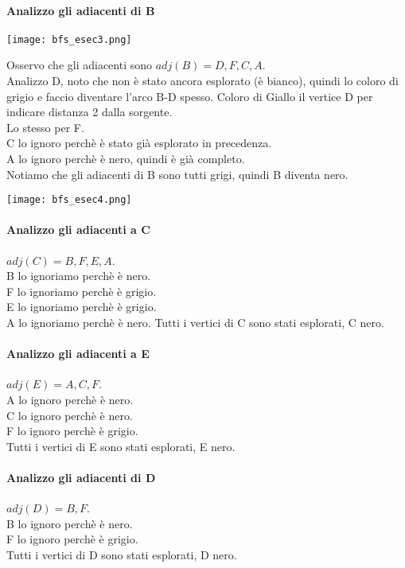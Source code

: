 \paragraph*{Analizzo gli adiacenti di B}
\begin{center}
    \texttt{[image: bfs\_esec3.png]}
\end{center}
Osservo che gli adiacenti sono \ra $adj(B) = D,F,C,A$.\\
Analizzo D, noto che non è stato ancora esplorato (è bianco), quindi lo coloro di grigio e
faccio diventare l'arco B-D spesso. Coloro di Giallo il vertice D per indicare distanza 2 dalla
sorgente.\\
Lo stesso per F.\\
C lo ignoro perchè è stato già esplorato in precedenza.\\
A lo ignoro perchè è nero, quindi è già completo.\\
Notiamo che gli adiacenti di B sono tutti grigi, quindi B diventa nero.
\begin{center}
    \texttt{[image: bfs\_esec4.png]}
\end{center}
\paragraph*{Analizzo gli adiacenti a C} \ra $adj(C) = B,F,E,A$.\\
B lo ignoriamo perchè è nero.\\
F lo ignoriamo perchè è grigio.\\
E lo ignoriamo perchè è grigio.\\
A lo ignoriamo perchè è nero.
Tutti i vertici di C sono stati esplorati, C \ra nero.
\paragraph*{Analizzo gli adiacenti a E} \ra $adj(E) = A,C,F$.\\
A lo ignoro perchè è nero.\\
C lo ignoro perchè è nero.\\
F lo ignoro perchè è grigio.\\
Tutti i vertici di E sono stati esplorati, E \ra nero.
\paragraph*{Analizzo gli adiacenti di D} \ra $adj(D) = B, F$.\\
B lo ignoro perchè è nero.\\
F lo ignoro perchè è grigio.\\
Tutti i vertici di D sono stati esplorati, D \ra nero.
